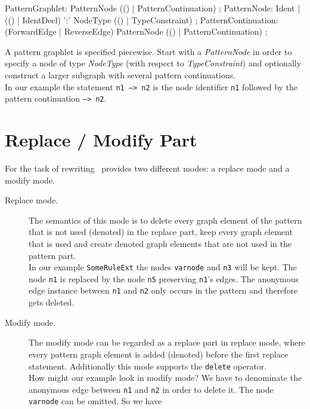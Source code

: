 \begin{rail}   
  PatternGraphlet: PatternNode (() | PatternContinuation) ;
  PatternNode: Ident | 
    (() | IdentDecl) ':' NodeType (() | TypeConstraint) ; 
  PatternContinuation: (ForwardEdge | ReverseEdge) PatternNode (() | PatternContinuation) ;
\end{rail}
A pattern graphlet is specified piecewise. Start with a \emph{PatternNode} in order to specify a node of type \emph{NodeType} (with respect to \emph{TypeConstraint}) and optionally construct a larger subgraph with several pattern continuations. \\
In our example the statement \texttt{n1 --> n2} is the node identifier \texttt{n1} followed by the pattern continuation \texttt{--> n2}.

\section{Replace / Modify Part}
\label{replacepart}
For the task of rewriting \GrG\ provides two different modes: a replace mode and a modify mode.
\begin{description}
  \item[Replace mode.] The semantics of this mode is to delete every graph element of the pattern that is not used (denoted) in the replace part, keep every graph element that is used and create denoted graph elements that are not used in the pattern part.\\
  In our example \texttt{SomeRuleExt} the nodes \texttt{varnode} and \texttt{n3} will be kept. The node \texttt{n1} is replaced by the node \texttt{n5} preserving \texttt{n1}'s edges. The anonymous edge instance between \texttt{n1} and \texttt{n2} only occurs in the pattern and therefore gets deleted.
  \item[Modify mode.] The modify mode can be regarded as a replace part in replace mode, where every pattern graph element is added (denoted) before the first replace statement. Additionally this mode supports the \texttt{delete} operator.\\
  How might our example look in modify mode? We have to denominate the anonymous edge between \texttt{n1} and \texttt{n2} in order to delete it. The node \texttt{varnode} can be omitted. So we have
\begin{grgen}
rule SomeRuleExt(varnode: Node): (Node, EdgeTypeB) {
  pattern {
    ...
    n1 -e0:Edge-> n2;
    ...
  }
  modify {
    n5 : NodeTypeC<n1>;
    n3 -e1:EdgeTypeB-> n5;
    delete(e0);
    eval {
      ...
\end{grgen}
\end{description}

